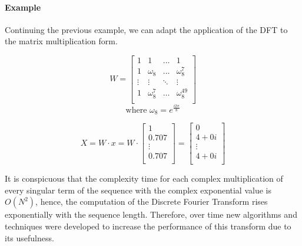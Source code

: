 \documentclass[
  oneside,
  11pt, a4paper,
  footinclude=true,
  headinclude=true,
  cleardoublepage=empty
]{scrbook}
\begin{document}

\paragraph{Example} Continuing the previous example, we can adapt the application of the DFT to the matrix multiplication form.

\begin{equation*}
    W =
    \begin{bmatrix}
        1      & 1              & \dots  & 1               \\
        1      & \omega_{8}     & \dots  & \omega_{8}^{7}  \\
        \vdots & \vdots         & \ddots & \vdots          \\
        1      & \omega_{8}^{7} & \dots  & \omega_{8}^{49} \\
    \end{bmatrix}
\end{equation*}
\begin{equation*}
    \text{where } \omega_{8} = e^{\frac{i 2 \pi}{8}}
\end{equation*}

\begin{equation*}
    X = W \cdot x = W \cdot 
    \begin{bmatrix}
        1      \\
        0.707  \\
        \vdots \\
        0.707  \\
    \end{bmatrix} =
    \begin{bmatrix}
        0      \\
        4+0i  \\
        \vdots \\
        4+0i  \\
    \end{bmatrix}
\end{equation*}


\hfill \break
It is conspicuous that the complexity time for each complex multiplication of every singular term of the sequence with the complex exponential value is \(O(N^{2})\), hence, the computation of the Discrete Fourier Transform rises exponentially with the sequence length. Therefore, over time new algorithms and techniques were developed to increase the performance of this transform due to its usefulness. 
\end{document}

